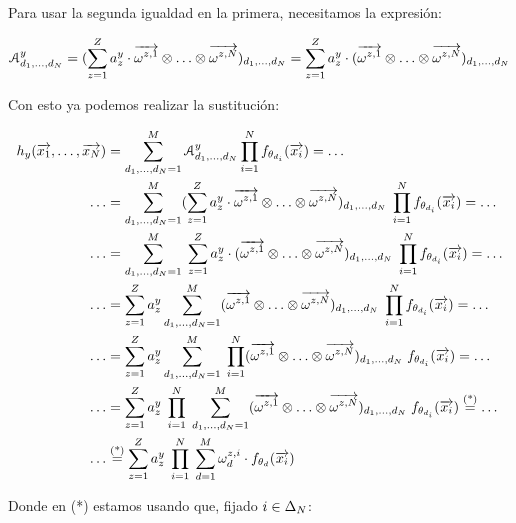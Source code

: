 Para usar la segunda igualdad en la primera, necesitamos la expresión:

\begin{equation}
	\mathcal{A}^y_{d_1, \ldots, d_N} = (\sum_{z = 1}^Z a_z^y \cdot \nv{\omega^{z, 1}} \otimes \ldots \otimes \nv{\omega^{z, N}})_{d_1, \ldots, d_N} = \sum_{z = 1}^Z a_z^y \cdot (\nv{\omega^{z, 1}} \otimes \ldots \otimes \nv{\omega^{z, N}})_{d_1, \ldots, d_N}
\end{equation}

Con esto ya podemos realizar la sustitución:

\begin{equation}
	\begin{split}
		h_y(\nv{x_1}, \ldots, \nv{x_N}) &= \sum_{d_1, \ldots, d_N = 1}^{M} \mathcal{A}^y_{d_1, \ldots, d_N} \prod_{i = 1}^N f_{\theta_{d_i}}(\nv{x_i}) = \ldots \\
		\ldots &= \sum_{d_1, \ldots, d_N = 1}^{M} (\sum_{z = 1}^Z a_z^y \cdot \nv{\omega^{z, 1}} \otimes \ldots \otimes \nv{\omega^{z, N}})_{d_1, \ldots, d_N} \; \prod_{i = 1}^N f_{\theta_{d_i}}(\nv{x_i}) = \ldots \\
		\ldots &= \sum_{d_1, \ldots, d_N = 1}^{M} \; \sum_{z = 1}^Z a_z^y \cdot (\nv{\omega^{z, 1}} \otimes \ldots \otimes \nv{\omega^{z, N}})_{d_1, \ldots, d_N} \; \prod_{i = 1}^N f_{\theta_{d_i}}(\nv{x_i}) = \ldots \\
		\ldots &= \sum_{z = 1}^Z a_z^y \sum_{d_1, \ldots, d_N = 1}^{M}  (\nv{\omega^{z, 1}} \otimes \ldots \otimes \nv{\omega^{z, N}})_{d_1, \ldots, d_N} \; \prod_{i = 1}^N f_{\theta_{d_i}}(\nv{x_i}) = \ldots \\
		\ldots &= \sum_{z = 1}^Z a_z^y \sum_{d_1, \ldots, d_N = 1}^{M} \; \prod_{i = 1}^N (\nv{\omega^{z, 1}} \otimes \ldots \otimes \nv{\omega^{z, N}})_{d_1, \ldots, d_N}  \; f_{\theta_{d_i}}(\nv{x_i}) = \ldots \\
		\ldots &= \sum_{z = 1}^Z a_z^y \; \prod_{i = 1}^N \; \sum_{d_1, \ldots, d_N = 1}^{M}  (\nv{\omega^{z, 1}} \otimes \ldots \otimes \nv{\omega^{z, N}})_{d_1, \ldots, d_N} \; f_{\theta_{d_i}}(\nv{x_i}) \encima{=}{\text{(*)}} \ldots \\
		\ldots &\encima{=}{\text{(*)}} \sum_{z = 1}^Z a_z^y \; \prod_{i = 1}^N \; \sum_{d = 1}^{M} \omega_d^{z,i}  \cdot f_{\theta_{d}}(\nv{x_i})
	\end{split}
\end{equation}

Donde en (*) estamos usando que, fijado $i \in \deltaset{N}$:

